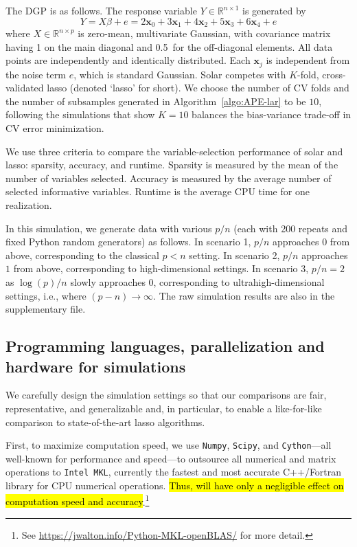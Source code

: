 \documentclass[11pt,authoryear]{elsarticle}
\begin{document}
The DGP is as follows. The response variable $Y \in \mathbb{R}^{n \times 1}$ is generated by
%
\begin{equation}
%
  Y =  X\beta + e = 2 \mathbf{x}_0 + 3 \mathbf{x}_1 + 4 \mathbf{x}_2 + 5 \mathbf{x}_3 + 6 \mathbf{x}_4  + e
  \label{eqn:pop_model}
\end{equation}
%
where $X \in \mathbb{R}^{n \times p}$ is zero-mean, multivariate Gaussian, with covariance matrix having 1 on the main diagonal and 0.5~for the off-diagonal elements. All data points are independently and identically distributed. Each $\mathbf{x}_j$ is independent from the noise term $e$, which is standard Gaussian. Solar competes with $K$-fold, cross-validated lasso (denoted `lasso' for short). We choose the number of CV folds and the number of subsamples generated in Algorithm~\ref{algo:APE-lar} to be $10$, following the \citet{friedman2001elements} simulations that show $K = 10$ balances the bias-variance trade-off in CV error minimization.

We use three criteria to compare the variable-selection performance of solar and lasso: sparsity, accuracy, and runtime. Sparsity is measured by the mean of the number of variables selected. Accuracy is measured by the average number of selected informative variables. Runtime is the average CPU time for one realization.

In this simulation, we generate data with various $p/n$ (each with 200 repeats and fixed Python random generators) as follows. In scenario 1, $p/n$ approaches $0$ from above, corresponding to the classical $p<n$ setting. In scenario 2, $p/n$ approaches $1$ from above, corresponding to high-dimensional settings. In scenario 3, $p/n=2$ as $\log(p)/n$ slowly approaches $0$, corresponding to ultrahigh-dimensional settings, i.e., where $(p-n)\rightarrow\infty$. The raw simulation results are also in the supplementary file.

\subsection{Programming languages, parallelization and hardware for simulations}

We carefully design the simulation settings so that our comparisons are fair, representative, and generalizable and, in particular, to enable a like-for-like comparison to state-of-the-art lasso algorithms.

First, to maximize computation speed, we use \texttt{Numpy}, \texttt{Scipy}, and \texttt{Cython}---all well-known for performance and speed---to outsource all numerical and matrix operations to \texttt{Intel MKL}, currently the fastest and most accurate C++/Fortran library for CPU numerical operations. \hl{Thus, will have only a negligible effect on computation speed and accuracy}.\footnote{See \url{https://jwalton.info/Python-MKL-openBLAS/} for more detail.}
\end{document}
